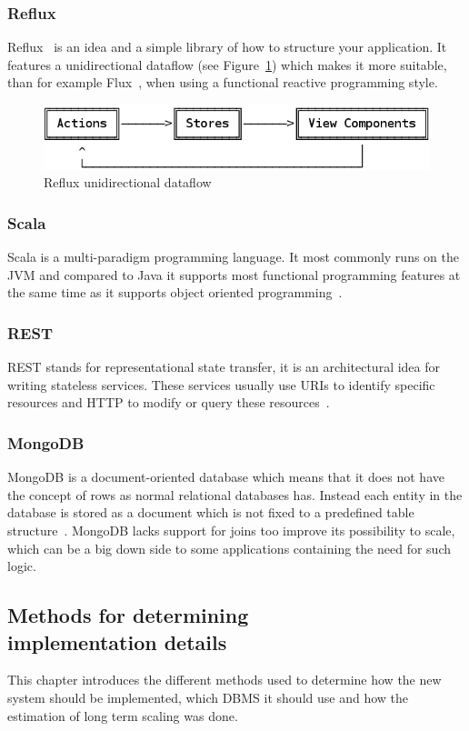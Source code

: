 \documentclass[a4paper,12pt]{article}
\begin{document}
\subsubsection{Reflux}
Reflux~\cite{REFLUX} is an idea and a simple library of how to structure your application. It
features a unidirectional dataflow (see Figure~\ref{fig:reflux}) which makes it more suitable, than
for example Flux~\cite{FLUX}, when using a functional reactive programming style.

\begin{figure}[htp] 
    \centering
    \includegraphics[scale=0.4]{reflux.png}
    \caption{Reflux unidirectional dataflow}
    \label{fig:reflux}
\end{figure}

\subsubsection{Scala} 
Scala is a multi-paradigm programming language. It most commonly runs on the JVM and compared to
Java it supports most functional programming features at the same time as it supports object
oriented programming~\cite{SCALA}.  

\subsubsection{REST} 
REST stands for representational state transfer, it is an architectural idea for writing stateless
services. These services usually use URIs to identify specific resources and HTTP to modify or query
these resources~\cite{REST}. 

\subsubsection{MongoDB}
MongoDB is a document-oriented database which means that it does not have the concept of rows as
normal relational databases has. Instead each entity in the database is stored as a document which
is not fixed to a predefined table structure~\cite{MONGODB}. MongoDB lacks support for joins too
improve its possibility to scale, which can be a big down side to some applications containing the
need for such logic.

\subsection{Methods for determining\\implementation details}
This chapter introduces the different methods used to determine how the new system should be
implemented, which DBMS it should use and how the estimation of long term scaling was done.
\end{document}
